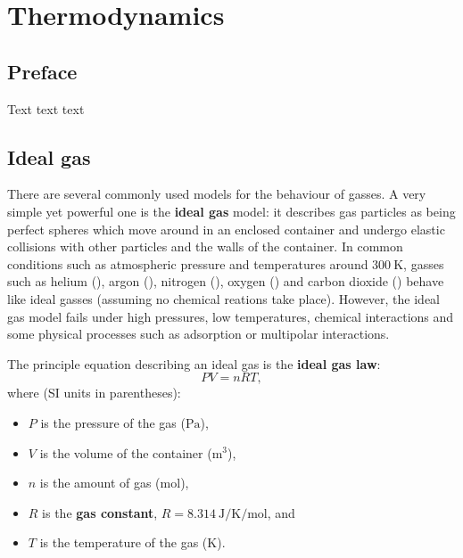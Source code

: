 \chapter{Thermodynamics}

\section{Preface}
Text text text

\section{Ideal gas}
There are several commonly used models for the behaviour of gasses. A very simple yet powerful one is the \textbf{ideal gas} model: it describes gas particles as being perfect spheres which move around in an enclosed container and undergo elastic collisions with other particles and the walls of the container. In common conditions such as atmospheric pressure and temperatures around $\SI{300}{\kelvin}$, gasses such as helium (), argon (), nitrogen (), oxygen () and carbon dioxide () behave like ideal gasses (assuming no chemical reations take place). However, the ideal gas model fails under high pressures, low temperatures, chemical interactions and some physical processes such as adsorption or multipolar interactions.

The principle equation describing an ideal gas is the \textbf{ideal gas law}:
\begin{equation}
	PV = nRT,
	\label{eq:ideal_gas_law}
\end{equation}
where (SI units in parentheses):
\begin{itemize}
	\item $P$ is the pressure of the gas ($\si{\pascal}$),
	\item $V$ is the volume of the container ($\si{\cubic\metre}$),
	\item $n$ is the amount of gas ($\si{\mol}$),
	\item $R$ is the \textbf{gas constant}, $R=\SI{8.314}{\joule\per\kelvin\per\mol}$, and
	\item $T$ is the temperature of the gas ($\si{\kelvin}$).
\end{itemize}


